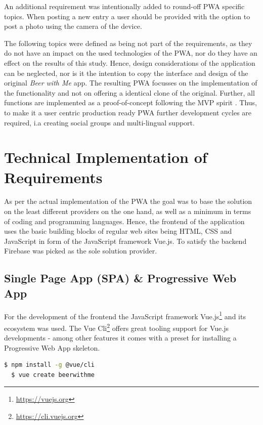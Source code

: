 An additional requirement was intentionally added to round-off PWA specific topics. When posting a new entry a user should be provided with the option to post a photo using the camera of the device.

The following topics were defined as being not part of the requirements, as they do not have an impact on the used technologies of the PWA, nor do they have an effect on the results of this study. Hence, design considerations of the application can be neglected, nor is it the intention to copy the interface and design of the original \textit{Beer with Me} app. The resulting PWA focusses on the implementation of the functionality and not on offering a identical clone of the original. Further, all functions are implemented as a proof-of-concept following the MVP spirit \citep{wikipediaMinimumViableProduct2019}. Thus, to make it a user centric production ready PWA further development cycles are required, i.a creating social groups and multi-lingual support.


\section{Technical Implementation of Requirements}
As per the actual implementation of the PWA the goal was to base the solution on the least different providers on the one hand, as well as a minimum in terms of coding and programming languages. Hence, the frontend of the application uses the basic building blocks of regular web sites being HTML, CSS and JavaScript in form of the JavaScript framework Vue.js. To satisfy the backend Firebase was picked as the sole solution provider.

\subsection{Single Page App (SPA) \& Progressive Web App}
For the development of the frontend the JavaScript framework Vue.js\footnote{\url{https://vuejs.org}} and its ecosystem was used. The Vue Cli\footnote{\url{https://cli.vuejs.org}} offers great tooling support for Vue.js developments - among other features it comes with a preset for installing a Progressive Web App skeleton.

\begin{lstlisting}[language=bash, caption=Installation and project creation commands with the Vue Cli, label=lst:vue-cli]
  $ npm install -g @vue/cli
  $ vue create beerwithme
\end{lstlisting}


